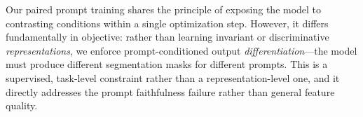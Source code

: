 Our paired prompt training shares the principle of exposing the model to contrasting conditions within a single optimization step. However, it differs fundamentally in objective: rather than learning invariant or discriminative \emph{representations}, we enforce prompt-conditioned output \emph{differentiation}---the model must produce different segmentation masks for different prompts. This is a supervised, task-level constraint rather than a representation-level one, and it directly addresses the prompt faithfulness failure rather than general feature quality.
